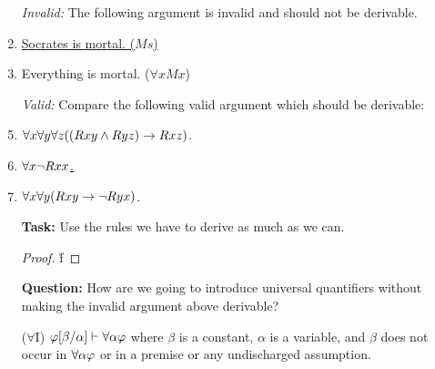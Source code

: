 \documentclass[a4paper, 11pt]{article} %
\begin{document}
\begin{enumerate}
  \item[\it Invalid:] The following argument is invalid and should not be derivable. 
    \item \underline{Socrates is mortal. \quad ($Ms$)\quad\quad}
    \item Everything is mortal. \quad ($\forall xMx$)
  \item[\it Valid:] Compare the following valid argument which should be derivable:
    \setcounter{enumi}{0}
    \item $\forall x\forall y\forall z((Rxy \wedge Ryz) \rightarrow Rxz)$.
    \item \underline{$\forall x\neg Rxx$.\quad\quad}
    \item $\forall x\forall y(Rxy \rightarrow \neg Ryx)$.
  \item[\bf Task:] Use the rules we have to derive as much as we can.  
    \begin{proof}
            \pr{}
            \pr{}
            
            
            
            
        \open
                  
            \open
                
                
                
                \r{f}
            \close
            
        \close
             
             
             
    \end{proof}
    \item[\bf Question:] How are we going to introduce universal quantifiers without making the invalid argument above derivable?
  \item[($\forall$I)] $\varphi[\beta/\alpha] \vdash \forall\alpha\varphi$ where $\beta$ is a constant, $\alpha$ is a variable, and $\beta$ does not occur in $\forall\alpha\varphi$ or in a premise or any undischarged assumption. 

\end{enumerate}
\end{document}
